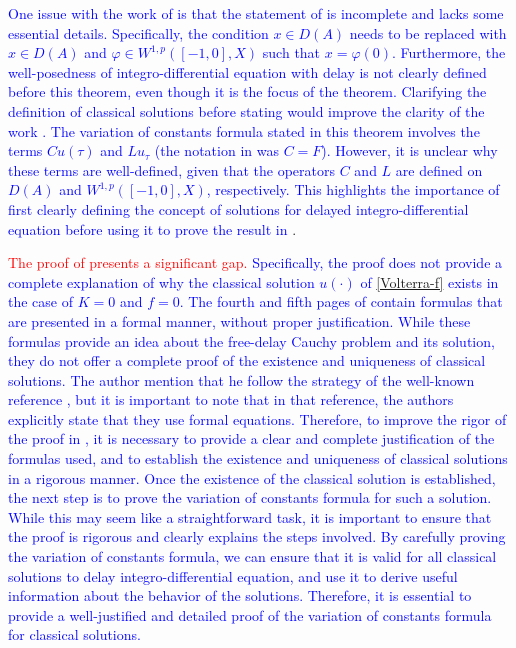 \documentclass[12pt]{amsart}
\theoremstyle{definition}
\theoremstyle{remark}
\theoremstyle{example}
\begin{document}
 \textcolor{blue} {One issue with the work of \cite{Zaza} is that the statement of \cite[Theorem 2.6]{Zaza} is incomplete and lacks some essential details. Specifically, the condition $x\in D(A)$ needs to be replaced with $x\in D(A)$ and $\varphi\in W^{1,p}([-1,0],X)$ such that $x=\varphi(0)$. Furthermore, the well-posedness of integro-differential equation with delay is not clearly defined before this theorem, even though it is the focus of the theorem. Clarifying the definition of classical solutions before stating} \textcolor{red} {\cite[Theorem 2.6]{Zaza}} \textcolor{blue}{ would improve the clarity of the work  \cite{Zaza}. The variation of constants formula stated in this theorem involves the terms $Cu(\tau)$ and $Lu_\tau$ (the notation in \cite{Zaza} was $C=F$). However, it is unclear why these terms are well-defined, given that the operators $C$ and $L$ are defined on $D(A)$ and $W^{1,p}([-1,0],X)$, respectively. This highlights the importance of first clearly defining the concept of solutions for delayed integro-differential equation before using it to prove the result in}\textcolor{red}{ \cite[Theorem 2.6]{Zaza}}.

\textcolor{red}{The proof of \cite[Theorem 2.6]{Zaza} presents a significant gap.} \textcolor{blue}{Specifically, the proof does not provide a complete explanation of why the classical solution $u(\cdot)$ of \eqref{Volterra-f} exists in the case of $K=0$ and $f=0$. The fourth and fifth pages of \cite{Zaza} contain formulas that are presented in a formal manner, without proper justification. While these formulas provide an idea about the free-delay Cauchy problem and its solution, they do not offer a complete proof of the existence and uniqueness of classical solutions. The author mention that he follow the strategy of the well-known reference \cite{DS}, but it is important to note that in that reference, the authors explicitly state that they use formal equations. Therefore, to improve the rigor of the proof in \cite[Theorem 2.6]{Zaza}, it is necessary to provide a clear and complete justification of the formulas used, and to establish the existence and uniqueness of classical solutions in a rigorous manner. Once the existence of the classical solution is established, the next step is to prove the variation of constants formula for such a solution. While this may seem like a straightforward task, it is important to ensure that the proof is rigorous and clearly explains the steps involved. By carefully proving the variation of constants formula, we can ensure that it is valid for all classical solutions to delay integro-differential equation, and use it to derive useful information about the behavior of the solutions. Therefore, it is essential to provide a well-justified and detailed proof of the variation of constants formula for classical solutions.}
\end{document}
